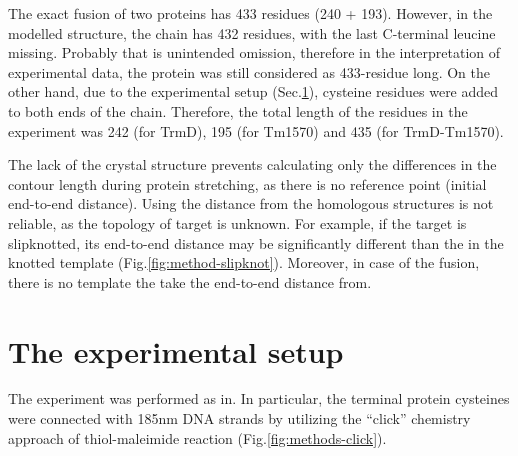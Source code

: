 
The exact fusion of two proteins has 433 residues (240 + 193).
However, in the modelled structure, the chain has 432 residues, with the last C-terminal leucine missing.
Probably that is unintended omission, therefore in the interpretation of experimental data, the protein was still considered as 433-residue long.
On the other hand, due to the experimental setup (Sec.\ref{sec:methods-setup}), cysteine residues were added to both ends of the chain.
Therefore, the total length of the residues in the experiment was 242 (for TrmD), 195 (for Tm1570) and 435 (for TrmD-Tm1570).

The lack of the crystal structure prevents calculating only the differences in the contour length during protein stretching, as there is no reference point (initial end-to-end distance).
Using the distance from the homologous structures is not reliable, as the topology of target is unknown.
For example, if the target is slipknotted, its end-to-end distance may be significantly different than the in the knotted template (Fig.\ref{fig:method-slipknot}).
Moreover, in case of the fusion, there is no template the take the end-to-end distance from.



\section{The experimental setup}
\label{sec:methods-setup}
The experiment was performed as in\cite{jahn2014charged}.
In particular, the terminal protein cysteines were connected with 185nm DNA strands by utilizing the ``click'' chemistry approach of thiol-maleimide reaction (Fig.\ref{fig:methods-click}).


